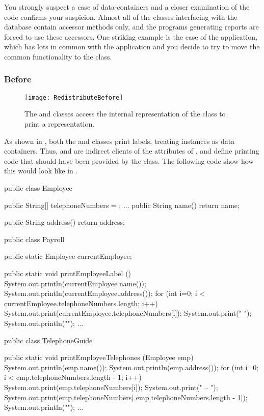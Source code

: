 \documentclass[a4paper,10pt,twoside]{book}
\begin{document}
You strongly suspect a case of data-containers and a closer examination of the code confirms your suspicion. Almost all of the classes interfacing with the database contain accessor methods only, and the programs generating reports are forced to use these accessors. One striking example is the case of the  application, which has lots in common with the  application and you decide to try to move the common functionality to the  class.

\subsubsection*{Before}

\begin{figure}
\begin{center}
\texttt{[image: RedistributeBefore]}
\caption{The  and  classes access the internal representation of the class  to print a representation. }
\end{center}
\end{figure}

As shown in , both the  and  classes print labels, treating  instances as data containers. Thus,  and  are indirect clients of the attributes of , and define printing code that should have been provided by the  class. The following code show how this would look like in .

\begin{code}
public class Employee {
	public String[] telephoneNumbers = {};
	...
	public String name() {
		return name;}
	
	public String address() {
		return address;}
}

public class Payroll {

	public static Employee currentEmployee;

	public static void printEmployeeLabel () {
		System.out.println(currentEmployee.name());
		System.out.println(currentEmployee.address());
		for (int i=0; i < currentEmployee.telephoneNumbers.length; i++) {
			System.out.print(currentEmployee.telephoneNumbers[i]);
			System.out.print(" ");}
		System.out.println("");}
...
}

public class TelephoneGuide {

	public static void printEmployeeTelephones (Employee emp) {
		System.out.println(emp.name());
		System.out.println(emp.address());
		for (int i=0; i < emp.telephoneNumbers.length - 1; i++) {
			System.out.print(emp.telephoneNumbers[i]);
			System.out.print(" -- ");}
		System.out.print(emp.telephoneNumbers[
				emp.telephoneNumbers.length - 1]);
		System.out.println("");}
	...
}
\end{code}
\end{document}
